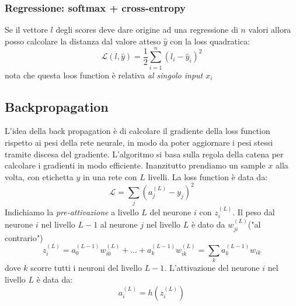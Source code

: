 \subsubsection{Regressione: softmax + cross-entropy}
Se il vettore $ l $ degli scores deve dare origine ad una regressione di $ n $ valori allora posso calcolare la distanza dal valore atteso $ \hat{y} $ con la loss quadratica:
\[
	\mathcal{L}\left(l, \hat{y}\right) = \frac{1}{2} \sum_{i=1}^{n} \left(l_i - \hat{y}_i\right)^2
\]
nota che questa loos function è relativa \textit{al singolo input $ x_i $}

\subsection{Backpropagation}
L'idea della back propagation è di calcolare il gradiente della loss function rispetto ai pesi della rete neurale, in modo da poter aggiornare i pesi stessi tramite discesa del gradiente. L'algoritmo si basa sulla regola della catena per calcolare i gradienti in modo efficiente.
\vskip3mm
Inanzitutto prendiamo un sample $ x $ alla volta, con etichetta $ y $ in una rete con $ L $ livelli. La loss function è data da:
\[
	\mathcal{L} = \sum_{j} \left(a_j^{\left(L\right)} - y_j\right)^2
\]
Indichiamo la \textit{pre-attivazione} a livello $ L $ del neurone $ i $ con $ z_i^{\left(L\right)} $. Il peso dal neurone $ i $ nel livello $ L-1 $ al neurone $ j $ nel livello $ L $ è dato da $ w_{ji}^{\left(L\right)} $("al contrario")
\[
	z_i^{\left(L\right)} = a_0^{\left(L-1\right)} w_{i0}^{\left(L\right)} + \ldots  + a_k^{\left(L-1\right)} w_{ik}^{\left(L\right)} = \sum_{k} a_k ^{\left(L-1\right)} w_{ik}
\]
dove $ k $ scorre tutti i neuroni del livello $ L-1 $. L'attivazione del neurone $ i $ nel livello $ L $ è data da:
\[
	a_i^{\left(L\right)} = h\left(z_i^{\left(L\right)}\right)
\]

